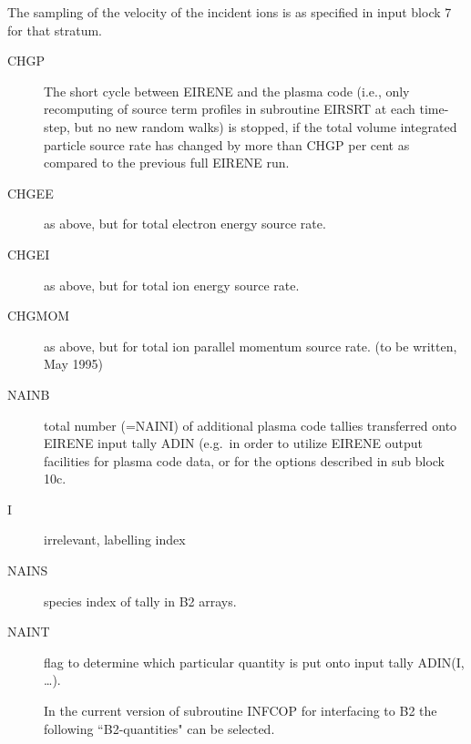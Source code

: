 The sampling of the velocity of the incident ions is as specified in input
block 7 for that stratum.
\begin{description}
  \item[CHGP] The short cycle between EIRENE and the plasma code (i.e., only
        recomputing of source term profiles in subroutine EIRSRT at each time-step, but
        no new random walks) is stopped, if the total volume integrated particle source
        rate has changed by more than CHGP per cent as compared to the previous full
        EIRENE run.
  \item[CHGEE] as above, but for total electron energy source rate.
  \item[CHGEI] as above, but for total ion energy source rate.
  \item[CHGMOM] as above, but for total ion parallel momentum source rate.
        (to be written, May 1995)
  \item[NAINB] total number (=NAINI) of additional
        plasma code tallies transferred onto EIRENE input tally ADIN (e.g.\ in order to
        utilize EIRENE output facilities for plasma code data, or for the options
        described in sub block 10c.
  \item[I] irrelevant, labelling index
  \item[NAINS] species index of tally in B2
        arrays.
  \item[NAINT] flag to determine which particular quantity is put onto input
        tally ADIN(I, \dots).

        In the current version of subroutine INFCOP for interfacing to B2 the following
        ``B2-quantities" can be selected.


\end{description}
